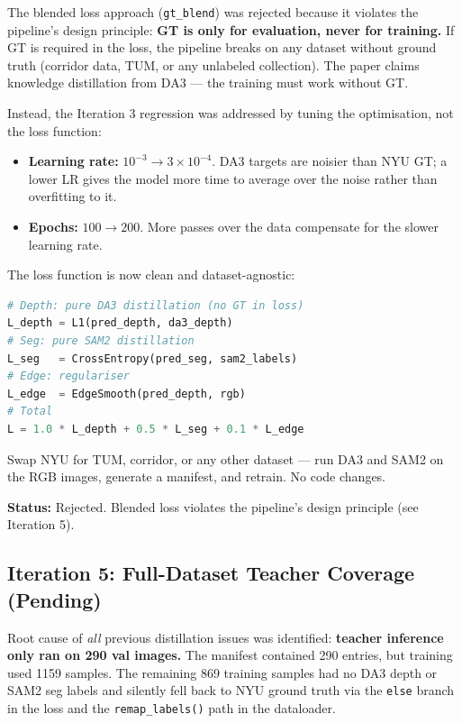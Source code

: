 \documentclass[11pt,a4paper]{article}
\begin{document}
The blended loss approach (\texttt{gt\_blend}) was rejected because it
violates the pipeline's design principle: \textbf{GT is only for
evaluation, never for training.} If GT is required in the loss, the
pipeline breaks on any dataset without ground truth (corridor data,
TUM, or any unlabeled collection). The paper claims knowledge
distillation from DA3 --- the training must work without GT.

Instead, the Iteration 3 regression was addressed by tuning the
optimisation, not the loss function:

\begin{itemize}[nosep]
  \item \textbf{Learning rate:} $10^{-3} \to 3 \times 10^{-4}$. DA3 targets
    are noisier than NYU GT; a lower LR gives the model more time to
    average over the noise rather than overfitting to it.
  \item \textbf{Epochs:} $100 \to 200$. More passes over the data compensate
    for the slower learning rate.
\end{itemize}

The loss function is now clean and dataset-agnostic:

\begin{lstlisting}[language=Python]
# Depth: pure DA3 distillation (no GT in loss)
L_depth = L1(pred_depth, da3_depth)
# Seg: pure SAM2 distillation
L_seg   = CrossEntropy(pred_seg, sam2_labels)
# Edge: regulariser
L_edge  = EdgeSmooth(pred_depth, rgb)
# Total
L = 1.0 * L_depth + 0.5 * L_seg + 0.1 * L_edge
\end{lstlisting}

Swap NYU for TUM, corridor, or any other dataset --- run DA3 and SAM2
on the RGB images, generate a manifest, and retrain. No code changes.

\textbf{Status:} Rejected. Blended loss violates the pipeline's design
principle (see Iteration 5).

\subsection{Iteration 5: Full-Dataset Teacher Coverage (Pending)}

Root cause of \emph{all} previous distillation issues was identified:
\textbf{teacher inference only ran on 290 val images.} The manifest
contained 290 entries, but training used 1159 samples. The remaining
869 training samples had no DA3 depth or SAM2 seg labels and silently
fell back to NYU ground truth via the \texttt{else} branch in
the loss and the \texttt{remap\_labels()} path in the dataloader.
\end{document}

